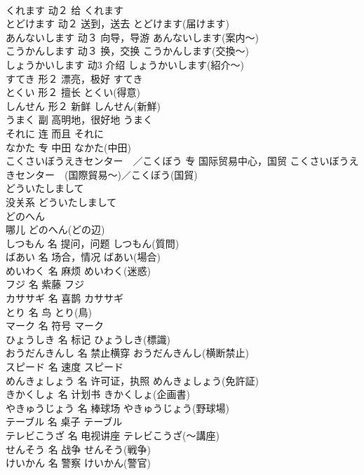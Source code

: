 \documentclass[8pt]{extreport}
\begin{document}
\begin{CJK}{UTF8}{min}
\\	くれます	动２	给	くれます	
\\	とどけます	动２	送到，送去	とどけます(届けます)	
\\	あんないします	动３	向导，导游	あんないします(案内～)	
\\	こうかんします	动３	换，交换	こうかんします(交換～)	
\\	しょうかいします	动3	介绍	しょうかいします(紹介～)	
\\	すてき	形２	漂亮，极好	すてき	
\\	とくい	形２	擅长	とくい(得意)	
\\	しんせん	形２	新鲜	しんせん(新鮮)	
\\	うまく	副	高明地，很好地	うまく	
\\	それに	连	而且	それに	
\\	なかた	专	中田	なかた(中田)	
\\	こくさいぼうえきセンター　／こくぼう	专	国际贸易中心，国贸	こくさいぼうえきセンター　(国際貿易～)／こくぼう(国貿)	
\\	どういたしまして	
\\	没关系	どういたしまして	
\\	どのへん	
\\	哪儿	どのへん(どの辺)	
\\	しつもん	名	提问，问题	しつもん(質問)	
\\	ばあい	名	场合，情况	ばあい(場合)	
\\	めいわく	名	麻烦	めいわく(迷惑)	
\\	フジ	名	紫藤	フジ	
\\	カササギ	名	喜鹊	カササギ	
\\	とり	名	鸟	とり(鳥)	
\\	マーク	名	符号	マーク	
\\	ひょうしき	名	标记	ひょうしき(標識)	
\\	おうだんきんし	名	禁止横穿	おうだんきんし(横断禁止)	
\\	スピード	名	速度	スピード	
\\	めんきょしょう	名	许可证，执照	めんきょしょう(免許証)	
\\	きかくしょ	名	计划书	きかくしょ(企画書)	
\\	やきゅうじょう	名	棒球场	やきゅうじょう(野球場)	
\\	テーブル	名	桌子	テーブル	
\\	テレビこうざ	名	电视讲座	テレビこうざ(～講座)	
\\	せんそう	名	战争	せんそう(戦争)	
\\	けいかん	名	警察	けいかん(警官)	

\end{CJK}
\end{document}
